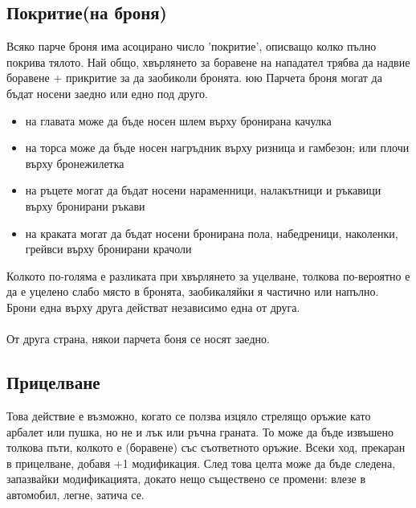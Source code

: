 \begin{footnotesize}
\subsection{Покритие(на броня)}
Всяко парче броня има асоцирано число 'покритие', описващо колко пълно покрива тялото.
Най общо, хвърлянето за боравене на нападател трябва да надвие боравене + прикритие за да заобиколи бронята. 
юю
Парчета броня могат да бъдат носени заедно или едно под друго.
\begin{itemize}
\item{на главата може да бъде носен шлем върху бронирана качулка}
\item{на торса може да бъде носен нагръдник върху ризница и гамбезон; или плочи върху бронежилетка}
\item{на ръцете могат да бъдат носени нараменници, налакътници и ръкавици върху бронирани ръкави}
\item{на краката могат да бъдат носени бронирана пола, набедреници, наколенки, грейвси върху бронирани крачоли}
\end{itemize}

Колкото по-голяма е разликата при хвърлянето за уцелване, толкова по-вероятно е да е уцелено слабо място в бронята, заобикаляйки я частично или напълно.
Брони една върху друга действат независимо една от друга.
\\
\\
От друга страна, някои парчета боня се носят заедно.
\\


\begin{multicols}{2}
\subsection{Прицелване}
Това действие е възможно, когато се ползва изцяло стрелящо оръжие като арбалет или пушка, но не и лък или ръчна граната.
То може да бъде извъшено толкова пъти, колкото е (боравене) със съответното оръжие.
Всеки ход, прекаран в прицелване, добавя +1 модификация.
След това целта може да бъде следена, запазвайки модификацията, докато нещо съществено се промени: влезе в автомобил, легне, затича се.



\end{multicols}
\end{footnotesize}

